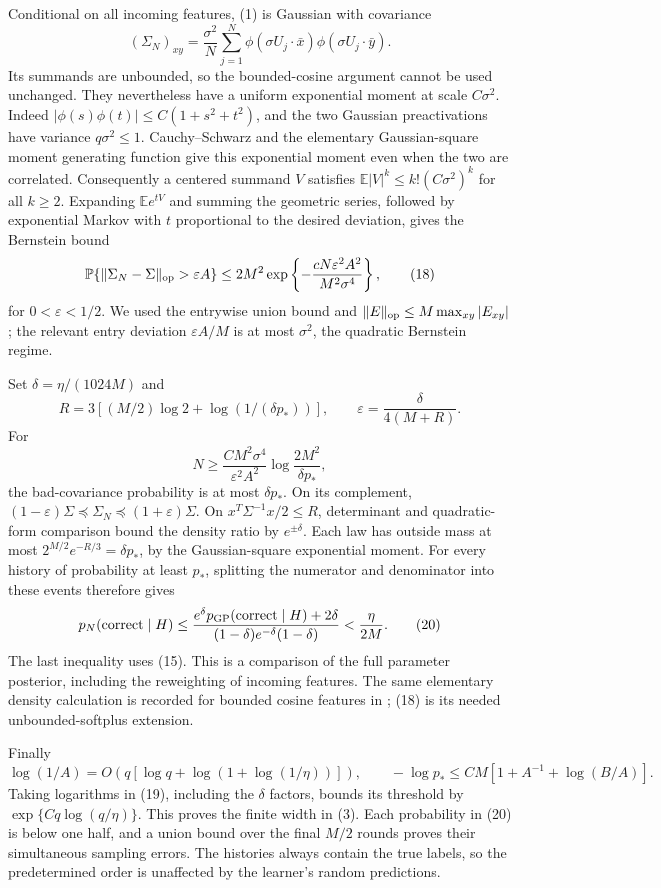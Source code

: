 \documentclass[11pt]{article}
\newcommand{\E}{\mathbb E}\newcommand{\Pp}{\mathbb P}
\begin{document}
Conditional on all incoming features, (1) is Gaussian with covariance
\[
 (\Sigma_N)_{xy}=\frac{\sigma^2}{N}
     \sum_{j=1}^N\phi(\sigma U_j\cdot\bar x)
                    \phi(\sigma U_j\cdot\bar y).
\]
Its summands are unbounded, so the bounded-cosine argument cannot be
used unchanged. They nevertheless have a uniform exponential moment
at scale $C\sigma^2$. Indeed
$|\phi(s)\phi(t)|\le C(1+s^2+t^2)$, and the two Gaussian
preactivations have variance $q\sigma^2\le1$.
Cauchy--Schwarz and the elementary Gaussian-square moment generating
function give this exponential moment even when the two are correlated.
Consequently a centered summand $V$ satisfies
$\E|V|^k\le k!(C\sigma^2)^k$ for all $k\ge2$.
Expanding $\E e^{tV}$ and summing the geometric series, followed by
exponential Markov with $t$ proportional to the desired deviation,
gives the Bernstein bound
\[
 \Pp\{\|\Sigma_N-\Sigma\|_{\rm op}>\varepsilon A\}
  \le2M^2\exp\left\{-\frac{cN\varepsilon^2 A^2}
                                      {M^2\sigma^4}\right\},  \tag{18}
\]
for $0<\varepsilon<1/2$. We used the entrywise union bound and
$\|E\|_{\rm op}\le M\max_{xy}|E_{xy}|$; the relevant entry deviation
$\varepsilon A/M$ is at most $\sigma^2$, the quadratic Bernstein regime.

Set $\delta=\eta/(1024M)$ and
\[
 R=3[(M/2)\log2+\log(1/(\delta p_*))],\qquad
 \varepsilon=\frac\delta{4(M+R)}.
\]
For
\[
 N\ge\frac{CM^2\sigma^4}{\varepsilon^2 A^2}
                              \log\frac{2M^2}{\delta p_*},     \tag{19}
\]
the bad-covariance probability is at most $\delta p_*$.
On its complement,
$(1-\varepsilon)\Sigma\preceq\Sigma_N
\preceq(1+\varepsilon)\Sigma$.
On $x^T\Sigma^{-1}x/2\le R$, determinant and quadratic-form comparison
bound the density ratio by $e^{\pm\delta}$. Each law has outside mass
at most $2^{M/2}e^{-R/3}=\delta p_*$, by the Gaussian-square exponential
moment. For every history of probability at least $p_*$, splitting the
numerator and denominator into these events therefore gives
\[
 p_N(\mathrm{correct}\mid H)
 \le\frac{e^\delta p_{\rm GP}(\mathrm{correct}\mid H)+2\delta}
                         {(1-\delta)e^{-\delta}(1-\delta)}
                         <\frac\eta{2M}.                     \tag{20}
\]
The last inequality uses (15). This is a comparison of the full
parameter posterior, including the reweighting of incoming features.
The same elementary density calculation is recorded for bounded cosine
features in \cite{cosine}; (18) is its needed unbounded-softplus extension.

Finally
\[
 \log(1/A)=O(q[\log q+\log(1+\log(1/\eta))]),\qquad
 -\log p_*\le CM[1+A^{-1}+\log(B/A)].
\]
Taking logarithms in (19), including the $\delta$ factors, bounds its
threshold by $\exp\{Cq\log(q/\eta)\}$. This proves the finite width
in (3). Each probability in (20) is below one half, and a union bound
over the final $M/2$ rounds proves their simultaneous sampling errors.
The histories always contain the true labels, so the predetermined order
is unaffected by the learner's random predictions.
\end{document}
